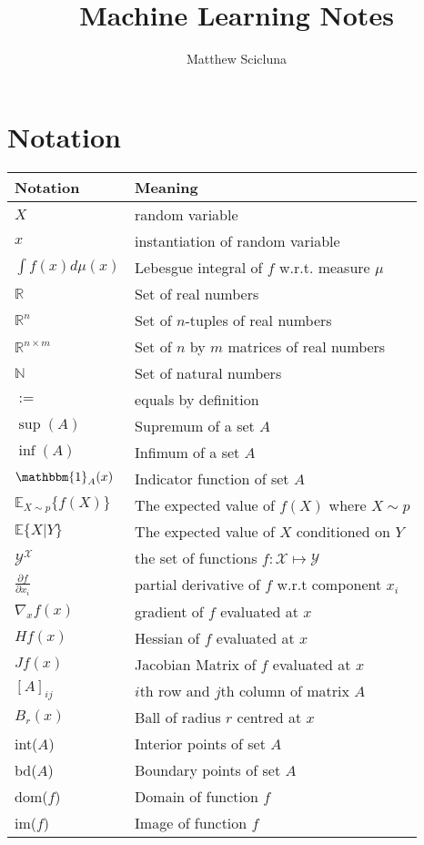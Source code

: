 \documentclass[]{article}
\theoremstyle{mattstyle}
\theoremstyle{definition}
\begin{document}
\title{Machine Learning Notes}
\author{Matthew Scicluna}
\maketitle

\newpage

\tableofcontents

\newpage

\section{Notation}

	\begin{center}		
		\begin{tabular}{*2l}   
			\toprule
			Notation & Meaning
			\\\midrule
			$X$ & random variable \\
			$x$ & instantiation of random variable\\
			$\int f(x) d\mu(x)$ & Lebesgue integral of $f$ w.r.t. measure $\mu$\\
			$\mathbb{R}$ & Set of real numbers\\
			$\mathbb{R}^n$ & Set of $n$-tuples of real numbers\\
			$\mathbb{R}^{n\times m}$ & Set of $n$ by $m$ matrices of real numbers\\
			$\mathbb{N}$ & Set of natural numbers \\
			$:=$ & equals by definition \\
			$\sup(A)$ & Supremum of a set $A$ \\
			$\inf(A)$ & Infimum of a set $A$ \\
			$\mathbbm{1}_{A}(x)$ & Indicator function of set $A$ \\
			$\mathbb{E}_{X\sim p}\{f(X)\}$ & The expected value of $f(X)$ where $X\sim p$\\
			$\mathbb{E}\{X|Y\}$ & The expected value of $X$ conditioned on $Y$ \\
			$\mathcal{Y}^\mathcal{X}$ & the set of functions $f: \mathcal{X}\mapsto \mathcal{Y}$\\
			$\frac{\partial f}{\partial x_i}$ & partial derivative of $f$ w.r.t component $x_i$\\
			$\nabla_{x} f(x)$ & gradient of $f$ evaluated at $x$\\
			$Hf(x)$ & Hessian of $f$ evaluated at $x$\\
			$Jf(x)$ & Jacobian Matrix of $f$ evaluated at $x$\\
			$[A]_{ij}$ & $i$th row and $j$th column of matrix $A$ \\
			$B_r(x)$ & Ball of radius $r$ centred at $x$ \\
			int($A$) & Interior points of set $A$ \\
			bd($A$) & Boundary points of set $A$ \\
			dom($f$) & Domain of function $f$ \\
			im($f$) & Image of function $f$
			\\\bottomrule
			\hline
		\end{tabular}
	\end{center}
\end{document}
